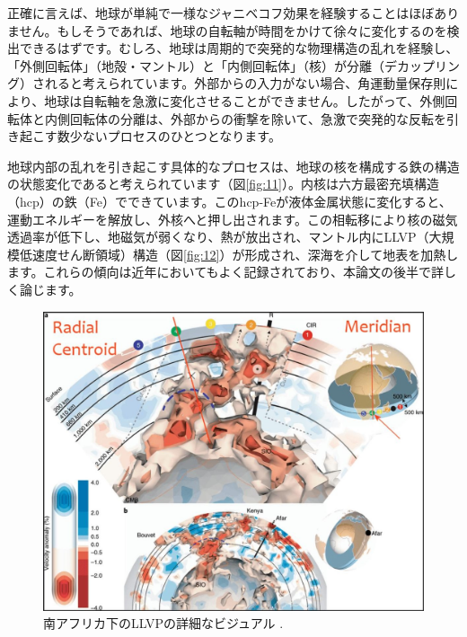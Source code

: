\documentclass[10pt,twocolumn,letterpaper]{article}
\begin{document}
正確に言えば、地球が単純で一様なジャニベコフ効果を経験することはほぼありません。もしそうであれば、地球の自転軸が時間をかけて徐々に変化するのを検出できるはずです。むしろ、地球は周期的で突発的な物理構造の乱れを経験し、「外側回転体」（地殻・マントル）と「内側回転体」（核）が分離（デカップリング）されると考えられています。外部からの入力がない場合、角運動量保存則により、地球は自転軸を急激に変化させることができません。したがって、外側回転体と内側回転体の分離は、外部からの衝撃を除いて、急激で突発的な反転を引き起こす数少ないプロセスのひとつとなります。

地球内部の乱れを引き起こす具体的なプロセスは、地球の核を構成する鉄の構造の状態変化であると考えられています（図\ref{fig:11}）。内核は六方最密充填構造（hcp）の鉄（Fe）でできています\cite{141}。このhcp-Feが液体金属状態に変化すると、運動エネルギーを解放し、外核へと押し出されます。この相転移により核の磁気透過率が低下し、地磁気が弱くなり、熱が放出され、マントル内にLLVP（大規模低速度せん断領域）構造（図\ref{fig:12}）\cite{38}が形成され、深海を介して地表を加熱します。これらの傾向は近年においてもよく記録されており、本論文の後半で詳しく論じます。


\begin{figure}[t]
\begin{center}
   \includegraphics[width=1\linewidth]{llvp.jpg}
\end{center}
   \caption{南アフリカ下のLLVPの詳細なビジュアル \cite{28}.}
\label{fig:12}
\label{fig:onecol}
\end{figure}
\end{document}
